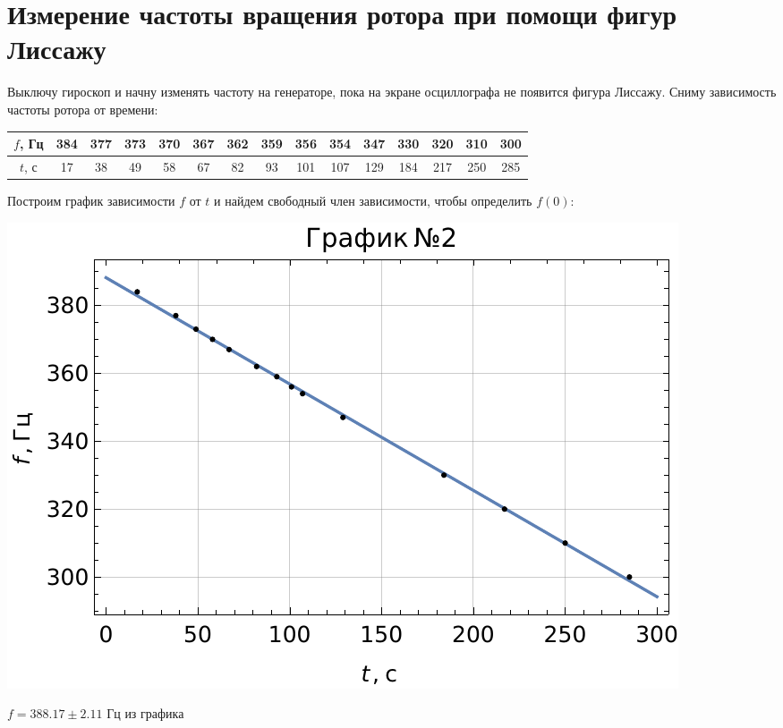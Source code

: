 \documentclass[a4paper, 12pt]{article}
\begin{document}
\section{Измерение частоты вращения ротора при помощи фигур Лиссажу}
Выключу гироскоп и начну изменять частоту на генераторе, пока на экране осциллографа не появится фигура Лиссажу. Сниму зависимость частоты ротора от времени:
\begin{center}
\begin{tabular}{|c|c|c|c|c|c|c|c|c|c|c|c|c|c|c|}
\hline
$f$, Гц & 384 & 377 & 373 & 370 & 367 & 362 & 359 & 356 & 354 & 347 & 330 & 320 & 310 & 300 \\ \hline
$t$, с & 17  & 38  & 49  & 58  & 67  & 82  & 93  & 101 & 107 & 129 & 184 & 217 & 250 & 285 \\ \hline
\end{tabular}
\end{center}
 Построим график зависимости $f$ от $t$ и найдем свободный член зависимости, чтобы определить $f(0)$:
\begin{center}
\includegraphics[scale=1]{freqt}
\end{center}
$f = 388.17 \pm 2.11$ Гц из графика
\end{document}

